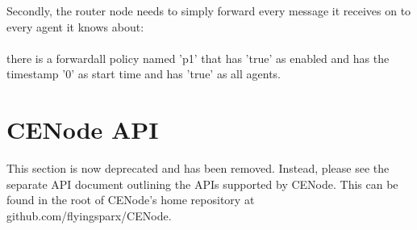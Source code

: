 \documentclass{scrartcl}
\newcommand{\ce}[1]{\textsf{#1}}
\begin{document}
Secondly, the router node needs to simply forward every message it receives on to every agent it knows about:\\
\\\ce{there is a forwardall policy named 'p1' that has 'true' as enabled and has the timestamp '0' as start time and has 'true' as all agents.}


\section{CENode API}
\label{api}
\begin{emph}
This section is now deprecated and has been removed. Instead, please see the separate API document outlining the APIs supported by CENode. This can be found in the root of CENode's home repository at github.com/flyingsparx/CENode.
\end{emph}



\end{document}
